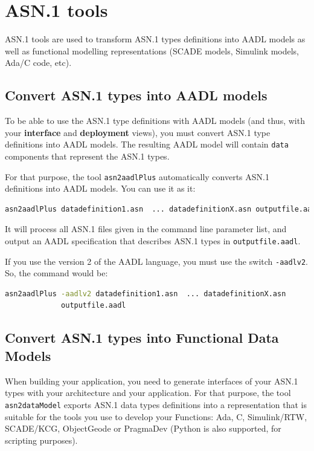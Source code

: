 \documentclass[11pt]{book}
\newcommand{\Concept}[1]{#1\xspace}
\newcommand{\aadl}{\Concept{AADL}}
\begin{document}
   \section{ASN.1 tools}
   ASN.1 tools are used to transform ASN.1 types definitions into AADL models
   as well as functional modelling representations (SCADE models, Simulink models,
    Ada/C code, etc).

      \subsection{Convert ASN.1 types into AADL models}
      To be able to use the ASN.1 type definitions with \aadl models (and thus, with your
      \textbf{interface} and \textbf{deployment} views), you must convert ASN.1
      type definitions into AADL models. The resulting AADL model will
      contain \texttt{data} components that represent the ASN.1 types.

      For that purpose, the tool \texttt{asn2aadlPlus} automatically converts
      ASN.1 definitions into AADL models. You can use it as it:
      \begin{lstlisting}[language=bash]
asn2aadlPlus datadefinition1.asn  ... datadefinitionX.asn outputfile.aadl
      \end{lstlisting}

      It will process all ASN.1 files given in the command line parameter list, and output an AADL
      specification that describes ASN.1 types in \texttt{outputfile.aadl}.

      If you use the version 2 of the \aadl language, you must use the switch
      \texttt{-aadlv2}. So, the command would be:

      \begin{lstlisting}[language=bash]
asn2aadlPlus -aadlv2 datadefinition1.asn  ... datadefinitionX.asn 
             outputfile.aadl
      \end{lstlisting}

      \subsection{Convert ASN.1 types into Functional Data Models}
      When building your application, you need to generate interfaces of your
      ASN.1 types with your architecture and your application. For that purpose,
      the tool \texttt{asn2dataModel} exports ASN.1 data types definitions into
      a representation that is suitable for the tools you use to develop your Functions: Ada, C,
      Simulink/RTW, SCADE/KCG, ObjectGeode or PragmaDev (Python is also supported, 
      for scripting purposes).
\end{document}

